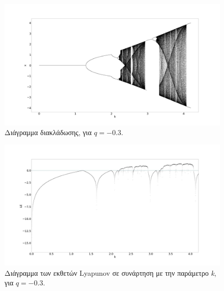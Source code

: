 \begin{figure}[ht]
	\centering
	\includegraphics[width=1\linewidth]{LateX images/sine q=-0.3/g1}
	\caption{Διάγραμμα διακλάδωσης, για $q=-0.3$.}
	\label{f:g44}
\end{figure}


\begin{figure}[ht]
	\centering
	\includegraphics[width=1\linewidth]{LateX images/sine q=-0.3/g2}
	\caption{Διάγραμμα των εκθετών Lyapunov σε συνάρτηση με την παράμετρο \emph{k}, για $q=-0.3$.}
	\label{f:g45}
\end{figure}



